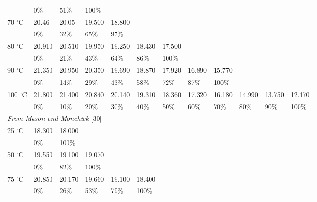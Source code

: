 \documentclass[11pt]{article}
\newcommand{\degC}{$^{\circ}$C}
\begin{document}
\begin{table}[htbp]
\begin{tabular}{llllllllllll}
          & 0\%    & 51\%   & 100\% & & & & & & & & \\
70 \degC  & 20.46  & 20.05  & 19.500 & 18.800 & & & & & & & \\
          & 0\%    & 32\%   & 65\%   & 97\%   & & & & & & & \\
80 \degC  & 20.910 & 20.510 & 19.950 & 19.250 & 18.430 & 17.500 & & & & & \\
          & 0\%    & 21\%   & 43\%   & 64\%   & 86\%   & 100\%  & & & & & \\
90 \degC  & 21.350 & 20.950 & 20.350 & 19.690 & 18.870 & 17.920 & 16.890 & 15.770 & & & \\
          & 0\%    & 14\%   & 29\%   & 43\%   & 58\%   & 72\%   & 87\%   & 100\%  & & & \\
100 \degC & 21.800 & 21.400 & 20.840 & 20.140 & 19.310 & 18.360 & 17.320 & 16.180 & 14.990 & 13.750 & 12.470 \\
          & 0\%    & 10\%   & 20\%   & 30\%   & 40\%   & 50\%   & 60\%   & 70\%   & 80\%   & 90\%   & 100\% \\
\midrule
\multicolumn{12}{l}{\textit{From Mason and Monchick} [30]} \\
25 \degC & 18.300 & 18.000 & & & & & & & & & \\
         & 0\%    & 100\%  & & & & & & & & & \\
50 \degC & 19.550 & 19.100 & 19.070 & & & & & & & & \\
         & 0\%    & 82\%   & 100\%  & & & & & & & & \\
75 \degC & 20.850 & 20.170 & 19.660 & 19.100 & 18.400 & & & & & & \\
         & 0\%    & 26\%   & 53\%   & 79\%   & 100\%  & & & & & & \\
\bottomrule
\end{tabular}
\end{table}
\end{document}
